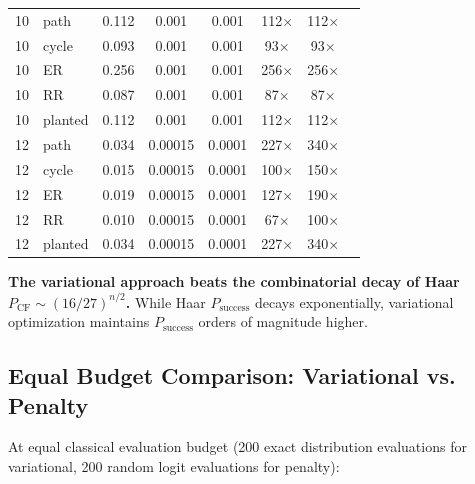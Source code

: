 \begin{table}[ht]
\begin{tabular}{clcccccc}
\midrule
10 & path & 0.112 & 0.001 & 0.001 & 112$\times$ & 112$\times$ \\
10 & cycle & 0.093 & 0.001 & 0.001 & 93$\times$ & 93$\times$ \\
10 & ER & 0.256 & 0.001 & 0.001 & 256$\times$ & 256$\times$ \\
10 & RR & 0.087 & 0.001 & 0.001 & 87$\times$ & 87$\times$ \\
10 & planted & 0.112 & 0.001 & 0.001 & 112$\times$ & 112$\times$ \\
\midrule
12 & path & 0.034 & 0.00015 & 0.0001 & 227$\times$ & 340$\times$ \\
12 & cycle & 0.015 & 0.00015 & 0.0001 & 100$\times$ & 150$\times$ \\
12 & ER & 0.019 & 0.00015 & 0.0001 & 127$\times$ & 190$\times$ \\
12 & RR & 0.010 & 0.00015 & 0.0001 & 67$\times$ & 100$\times$ \\
12 & planted & 0.034 & 0.00015 & 0.0001 & 227$\times$ & 340$\times$ \\
\bottomrule
\end{tabular}
\end{table}

\textbf{The variational approach beats the combinatorial decay of Haar $P_{\mathrm{CF}} \sim (16/27)^{n/2}$.} While Haar $P_{\mathrm{success}}$ decays exponentially, variational optimization maintains $P_{\mathrm{success}}$ orders of magnitude higher.

\subsection{Equal Budget Comparison: Variational vs. Penalty}

At equal classical evaluation budget (200 exact distribution evaluations for variational, 200 random logit evaluations for penalty):

